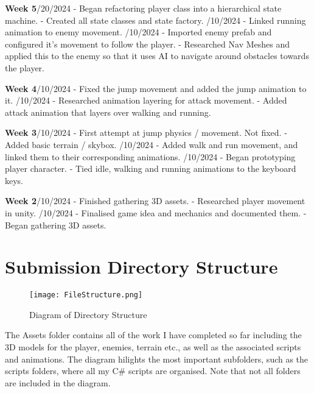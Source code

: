 \documentclass[]{final_report}
\begin{document}
\textbf{Week 5}/20/2024
\newline- Began refactoring player class into a hierarchical state machine.
\newline- Created all state classes and state factory.
/10/2024
\newline- Linked running animation to enemy movement.
/10/2024
\newline- Imported enemy prefab and configured it's movement to follow the player.
\newline- Researched Nav Meshes and applied this to the enemy so that it uses AI to navigate around obstacles towards the player.

\textbf{Week 4}/10/2024
\newline- Fixed the jump movement and added the jump animation to it.
/10/2024
\newline- Researched animation layering for attack movement.
\newline- Added attack animation that layers over walking and running.

\textbf{Week 3}/10/2024
\newline- First attempt at jump physics / movement. Not fixed.
\newline- Added basic terrain / skybox.
/10/2024
\newline- Added walk and run movement, and linked them to their corresponding animations.
/10/2024
\newline- Began prototyping player character.
\newline- Tied idle, walking and running animations to the keyboard keys.

\textbf{Week 2}/10/2024
\newline- Finished gathering 3D assets.
\newline- Researched player movement in unity.
/10/2024
\newline- Finalised game idea and mechanics and documented them.
\newline- Began gathering 3D assets.

\newpage
\section{Submission Directory Structure}
\begin{figure}[h!]
    \centering
    \texttt{[image: FileStructure.png]}
    \caption{Diagram of Directory Structure}
    \label{fig:label_name}
\end{figure}
The Assets folder contains all of the work I have completed so far including the 3D models for the player, enemies, terrain etc., as well as the associated scripts and animations. The diagram hilights the most important subfolders, such as the scripts folders, where all my C\# scripts are organised. Note that not all folders are included in the diagram.
\end{document}

